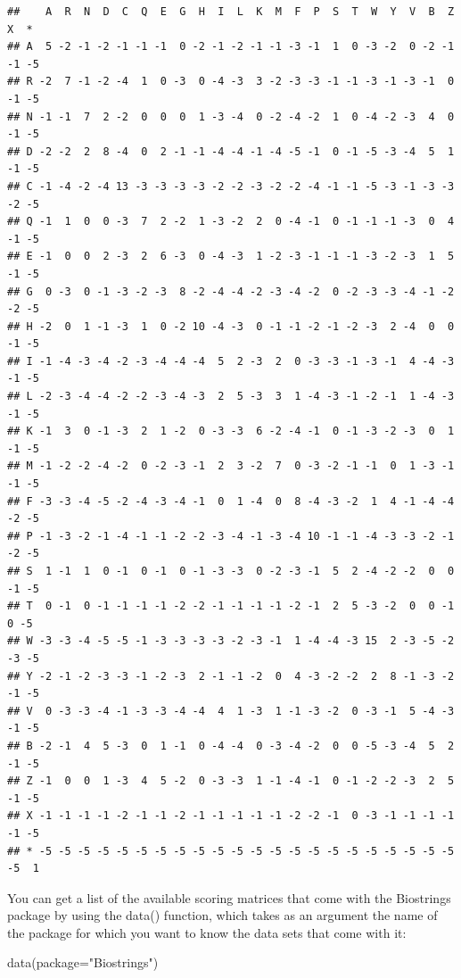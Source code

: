 \documentclass[
]{book}
\newenvironment{Shaded}{\begin{snugshade}}{\end{snugshade}}
\newcommand{\AttributeTok}[1]{\textcolor[rgb]{0.77,0.63,0.00}{#1}}
\newcommand{\FunctionTok}[1]{\textcolor[rgb]{0.00,0.00,0.00}{#1}}
\newcommand{\NormalTok}[1]{#1}
\newcommand{\StringTok}[1]{\textcolor[rgb]{0.31,0.60,0.02}{#1}}
\begin{document}
\begin{verbatim}
##    A  R  N  D  C  Q  E  G  H  I  L  K  M  F  P  S  T  W  Y  V  B  Z  X  *
## A  5 -2 -1 -2 -1 -1 -1  0 -2 -1 -2 -1 -1 -3 -1  1  0 -3 -2  0 -2 -1 -1 -5
## R -2  7 -1 -2 -4  1  0 -3  0 -4 -3  3 -2 -3 -3 -1 -1 -3 -1 -3 -1  0 -1 -5
## N -1 -1  7  2 -2  0  0  0  1 -3 -4  0 -2 -4 -2  1  0 -4 -2 -3  4  0 -1 -5
## D -2 -2  2  8 -4  0  2 -1 -1 -4 -4 -1 -4 -5 -1  0 -1 -5 -3 -4  5  1 -1 -5
## C -1 -4 -2 -4 13 -3 -3 -3 -3 -2 -2 -3 -2 -2 -4 -1 -1 -5 -3 -1 -3 -3 -2 -5
## Q -1  1  0  0 -3  7  2 -2  1 -3 -2  2  0 -4 -1  0 -1 -1 -1 -3  0  4 -1 -5
## E -1  0  0  2 -3  2  6 -3  0 -4 -3  1 -2 -3 -1 -1 -1 -3 -2 -3  1  5 -1 -5
## G  0 -3  0 -1 -3 -2 -3  8 -2 -4 -4 -2 -3 -4 -2  0 -2 -3 -3 -4 -1 -2 -2 -5
## H -2  0  1 -1 -3  1  0 -2 10 -4 -3  0 -1 -1 -2 -1 -2 -3  2 -4  0  0 -1 -5
## I -1 -4 -3 -4 -2 -3 -4 -4 -4  5  2 -3  2  0 -3 -3 -1 -3 -1  4 -4 -3 -1 -5
## L -2 -3 -4 -4 -2 -2 -3 -4 -3  2  5 -3  3  1 -4 -3 -1 -2 -1  1 -4 -3 -1 -5
## K -1  3  0 -1 -3  2  1 -2  0 -3 -3  6 -2 -4 -1  0 -1 -3 -2 -3  0  1 -1 -5
## M -1 -2 -2 -4 -2  0 -2 -3 -1  2  3 -2  7  0 -3 -2 -1 -1  0  1 -3 -1 -1 -5
## F -3 -3 -4 -5 -2 -4 -3 -4 -1  0  1 -4  0  8 -4 -3 -2  1  4 -1 -4 -4 -2 -5
## P -1 -3 -2 -1 -4 -1 -1 -2 -2 -3 -4 -1 -3 -4 10 -1 -1 -4 -3 -3 -2 -1 -2 -5
## S  1 -1  1  0 -1  0 -1  0 -1 -3 -3  0 -2 -3 -1  5  2 -4 -2 -2  0  0 -1 -5
## T  0 -1  0 -1 -1 -1 -1 -2 -2 -1 -1 -1 -1 -2 -1  2  5 -3 -2  0  0 -1  0 -5
## W -3 -3 -4 -5 -5 -1 -3 -3 -3 -3 -2 -3 -1  1 -4 -4 -3 15  2 -3 -5 -2 -3 -5
## Y -2 -1 -2 -3 -3 -1 -2 -3  2 -1 -1 -2  0  4 -3 -2 -2  2  8 -1 -3 -2 -1 -5
## V  0 -3 -3 -4 -1 -3 -3 -4 -4  4  1 -3  1 -1 -3 -2  0 -3 -1  5 -4 -3 -1 -5
## B -2 -1  4  5 -3  0  1 -1  0 -4 -4  0 -3 -4 -2  0  0 -5 -3 -4  5  2 -1 -5
## Z -1  0  0  1 -3  4  5 -2  0 -3 -3  1 -1 -4 -1  0 -1 -2 -2 -3  2  5 -1 -5
## X -1 -1 -1 -1 -2 -1 -1 -2 -1 -1 -1 -1 -1 -2 -2 -1  0 -3 -1 -1 -1 -1 -1 -5
## * -5 -5 -5 -5 -5 -5 -5 -5 -5 -5 -5 -5 -5 -5 -5 -5 -5 -5 -5 -5 -5 -5 -5  1
\end{verbatim}

You can get a list of the available scoring matrices that come with the Biostrings package by using the data() function, which takes as an argument the name of the package for which you want to know the data sets that come with it:

\begin{Shaded}
\begin{Highlighting}[]
\FunctionTok{data}\NormalTok{(}\AttributeTok{package=}\StringTok{"Biostrings"}\NormalTok{)}
\end{Highlighting}
\end{Shaded}
\end{document}
